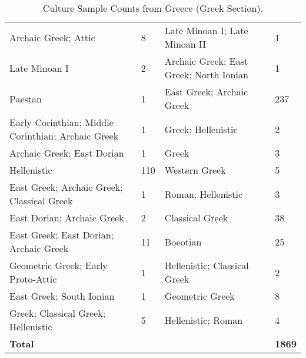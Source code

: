 \documentclass[11pt]{article}
\begin{document}
\begin{table*}[ht!]
{\begin{tabularx}{\textwidth}{lllX}
        Archaic Greek; Attic & 8 & Late Minoan I; Late Minoan II & 1 \\
        Late Minoan I & 2 & Archaic Greek; East Greek; North Ionian & 1 \\
        Paestan & 1 &  East Greek; Archaic Greek & 237 \\
        Early Corinthian; Middle Corinthian; Archaic Greek & 1 & Greek; Hellenistic & 2 \\
        Archaic Greek; East Dorian & 1  & Greek & 3 \\
        Hellenistic & 110  & Western Greek & 5 \\
        East Greek; Archaic Greek; Classical Greek & 1  & Roman; Hellenistic & 3 \\
        East Dorian; Archaic Greek & 2  & Classical Greek & 38 \\
        East Greek; East Dorian; Archaic Greek & 11  & Boeotian & 25 \\
        Geometric Greek; Early Proto-Attic & 1 & Hellenistic; Classical Greek & 2 \\
        East Greek; South Ionian & 1 & Geometric Greek & 8 \\
        Greek; Classical Greek; Hellenistic & 5  & Hellenistic; Roman & 4 \\
        \hline
        \rowcolor{brown!10}\textbf{Total} & & &\textbf{1869}\\
        \hline
    \end{tabularx}}
    \caption{Culture Sample Counts from Greece (Greek Section).}
    \label{tab:culture-sample-greece}
\end{table*}
\end{document}
